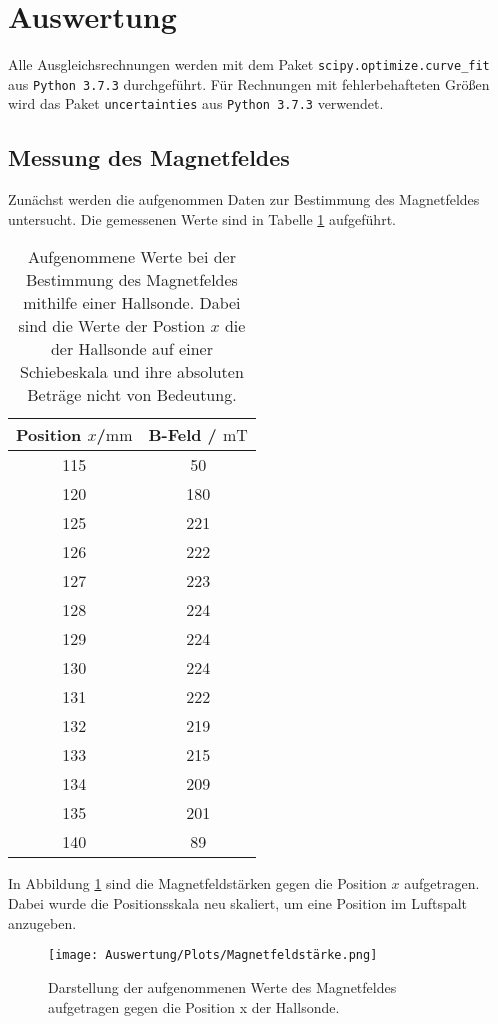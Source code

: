 \section{Auswertung}
Alle Ausgleichsrechnungen werden mit dem Paket \texttt{scipy.optimize.curve\_fit}  aus \texttt{Python 3.7.3} durchgeführt.
Für Rechnungen mit fehlerbehafteten Größen wird das Paket \texttt{uncertainties} aus \texttt{Python 3.7.3} verwendet.

\subsection{Messung des Magnetfeldes}
Zunächst werden die aufgenommen Daten zur Bestimmung des Magnetfeldes untersucht. Die gemessenen Werte
sind in Tabelle \ref{tab:MF_Messung} aufgeführt.
\begin{table}[H]
    \centering
    \caption{Aufgenommene Werte bei der Bestimmung des Magnetfeldes mithilfe einer Hallsonde. Dabei sind die Werte der Postion $x$ die der Hallsonde auf einer Schiebeskala und ihre absoluten Beträge nicht von Bedeutung.}
    \label{tab:MF_Messung}
    \begin{tabular}{cc}
      \toprule
      Position $x$/$\si{\milli\meter}$ & B-Feld / $\si{\milli\tesla}$  \\
      \midrule
      115 & 50  \\
      120 & 180 \\
      125 & 221 \\
      126 & 222 \\
      127 & 223 \\
      128 & 224 \\
      129 & 224 \\
      130 & 224 \\
      131 & 222 \\
      132 & 219 \\
      133 & 215 \\
      134 & 209 \\
      135 & 201 \\
      140 & 89  \\
      \bottomrule
  \end{tabular}
 \end{table} \noindent
 In Abbildung \ref{fig:MF_Messung} sind die Magnetfeldstärken gegen die Position $x$ aufgetragen. Dabei wurde die Positionsskala neu skaliert, um eine Position im Luftspalt anzugeben.
 \begin{figure}[H]
     \centering
     \texttt{[image: Auswertung/Plots/Magnetfeldstärke.png]}
     \caption{Darstellung der aufgenommenen Werte des Magnetfeldes aufgetragen gegen die Position x der Hallsonde.}
     \label{fig:MF_Messung}
 \end{figure} \noindent
